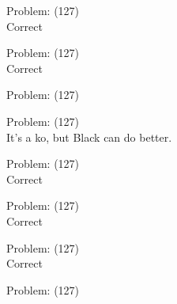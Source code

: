 \documentclass[11pt]{article}
\begin{document}
\begin{minipage}[t]{0.5\textwidth}
  {\centering
  
Problem: (127)\\
Correct\\
  }
\end{minipage}
\begin{minipage}[t]{0.5\textwidth}
  {\centering
  
Problem: (127)\\
Correct\\
  }
\end{minipage}
\begin{minipage}[t]{0.5\textwidth}
  {\centering
  
Problem: (127)\\
  }
\end{minipage}
\begin{minipage}[t]{0.5\textwidth}
  {\centering
  
Problem: (127)\\
It's a ko, but Black can do better.\\
  }
\end{minipage}
\begin{minipage}[t]{0.5\textwidth}
  {\centering
  
Problem: (127)\\
Correct\\
  }
\end{minipage}
\begin{minipage}[t]{0.5\textwidth}
  {\centering
  
Problem: (127)\\
Correct\\
  }
\end{minipage}
\begin{minipage}[t]{0.5\textwidth}
  {\centering
  
Problem: (127)\\
Correct\\
  }
\end{minipage}
\begin{minipage}[t]{0.5\textwidth}
  {\centering
  
Problem: (127)\\
  }
\end{minipage}
\end{document}
